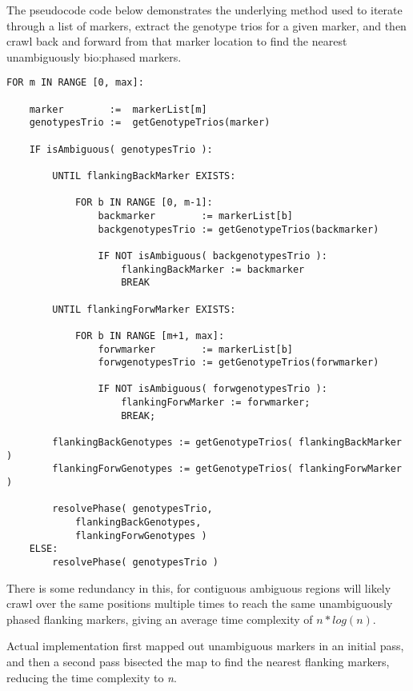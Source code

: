 The pseudocode code below demonstrates the underlying method used to iterate through a list of markers, extract the genotype trios for a given marker, and then crawl back and forward from that marker location to find the nearest unambiguously \gls{bio:phased} markers.


\begingroup
\begin{spacing}{1}
\begin{lstlisting}[label=code:neighbouringjs]
FOR m IN RANGE [0, max]:

	marker        :=  markerList[m]
	genotypesTrio :=  getGenotypeTrios(marker)
	
	IF isAmbiguous( genotypesTrio ):	

		UNTIL flankingBackMarker EXISTS:

			FOR b IN RANGE [0, m-1]:
				backmarker        := markerList[b]
				backgenotypesTrio := getGenotypeTrios(backmarker)
				
				IF NOT isAmbiguous( backgenotypesTrio ):
					flankingBackMarker := backmarker
					BREAK
		
		UNTIL flankingForwMarker EXISTS:

			FOR b IN RANGE [m+1, max]:
				forwmarker        := markerList[b]
				forwgenotypesTrio := getGenotypeTrios(forwmarker)
				
				IF NOT isAmbiguous( forwgenotypesTrio ):
					flankingForwMarker := forwmarker;
					BREAK;

		flankingBackGenotypes := getGenotypeTrios( flankingBackMarker ) 
		flankingForwGenotypes := getGenotypeTrios( flankingForwMarker ) 

		resolvePhase( genotypesTrio, 
			flankingBackGenotypes, 
			flankingForwGenotypes )
	ELSE:
		resolvePhase( genotypesTrio )
\end{lstlisting}
\vspace{-10pt}
\end{spacing}
\endgroup
\vspace{10pt}

There is some redundancy in this, for contiguous ambiguous regions will likely crawl over the same positions multiple times to reach the same unambiguously phased flanking markers, giving an average time complexity of $n * log(n)$. 

Actual implementation first mapped out unambiguous markers in an initial pass, and then a second pass bisected the map to find the nearest flanking markers, reducing the time complexity to \textit{n}.

